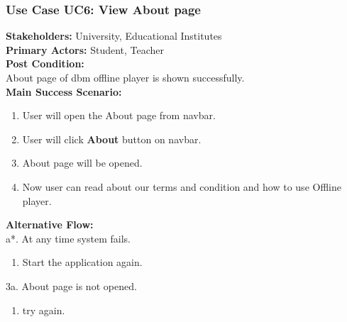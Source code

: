 \documentclass[12pt]{article}
\begin{document}
\subsubsection{Use Case UC6: View About page}
\textbf{Stakeholders: } University, Educational Institutes \\
\textbf{Primary Actors: } Student, Teacher \\
\textbf{Post Condition: }\\
About page of dbm offline player is shown successfully.\\
\textbf{Main Success Scenario: }
\begin{enumerate}
\item User will open the About page from navbar.
\item User will click \textbf{About} button on navbar.
\item About page will be opened.
\item Now user can read about our terms and condition and how to use Offline player.

\end{enumerate}
\textbf{Alternative Flow: }\\
a*. At any time system fails.
\begin{enumerate}
\item Start the application again.
\end{enumerate}
3a. About page is not opened.
\begin{enumerate}
\item try again.
\end{enumerate}
\end{document}
